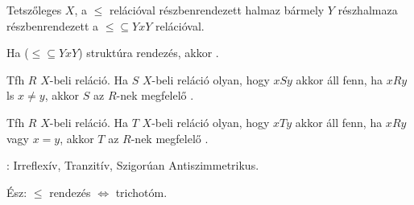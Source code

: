\begin{frame}
\begin{tcolorbox}[title={Def.: Szigorú, gyenge reláció, Lánc}]
Tetszőleges $X$, a $\leq$ relációval részbenrendezett halmaz bármely $Y$ részhalmaza részbenrendezett a $\leq \subseteq Y x Y$ relációval.\\
\msmallskip

Ha ($\leq \subseteq Y x Y$) struktúra rendezés, akkor .\\
\mmedskip

Tfh $R$ $X$-beli reláció. Ha $S$ $X$-beli reláció olyan, hogy $xSy$ akkor áll fenn, ha $xRy$ ls $x \neq y$, akkor $S$ az $R$-nek megfelelő .\\
\mmedskip

Tfh $R$ $X$-beli reláció. Ha $T$ $X$-beli reláció olyan, hogy $xTy$ akkor áll fenn, ha $xRy$ vagy $x = y$, akkor $T$ az $R$-nek megfelelő .\\
\mmedskip

: Irreflexív, Tranzitív, Szigorúan Antiszimmetrikus.\\
\mmedskip

Ész: $\leq$ rendezés $\iff$ trichotóm.
\end{tcolorbox}
\end{frame}


